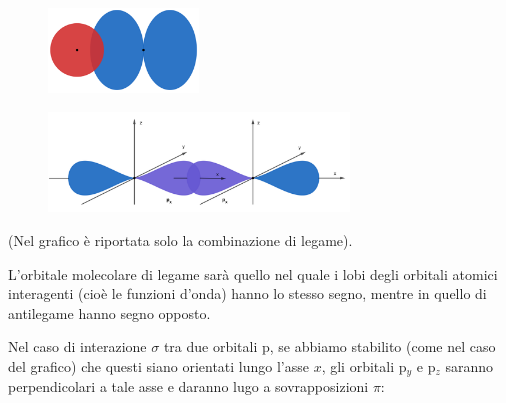 \hspace{1cm}\begin{minipage}{0.36\textwidth}
    \begin{figure}[H]
        \includegraphics[width=4cm]{immagini/legame_sigma_s_p.png}
    \end{figure}
    \end{minipage} 
\begin{minipage}{0.4\textwidth}
    \vspace{-0.5cm}\begin{figure}[H]
        \includegraphics[width=8cm]{immagini/legame_sigma_p_p.png}
    \end{figure}
    \end{minipage}

\vspace{0.2cm}(Nel grafico è riportata solo la combinazione di legame).

L'orbitale molecolare di legame sarà quello nel quale i lobi degli orbitali atomici interagenti (cioè le funzioni d'onda) hanno lo stesso segno, mentre in quello di antilegame hanno segno opposto.

Nel caso di interazione $\sigma$ tra due orbitali p, se abbiamo stabilito (come nel caso del grafico) che questi siano orientati lungo l'asse $x$, gli orbitali p$_y$ e p$_z$ saranno perpendicolari a tale asse e daranno lugo a sovrapposizioni $\pi$:

